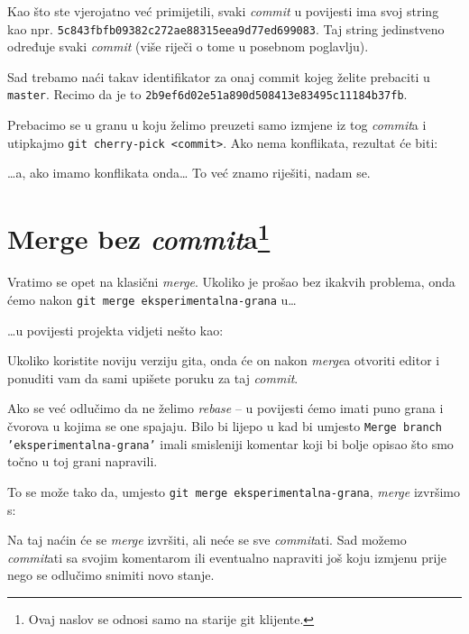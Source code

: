 Kao što ste vjerojatno već primijetili, svaki \emph{commit} u povijesti ima svoj string kao npr. \verb+5c843fbfb09382c272ae88315eea9d77ed699083+.
Taj string jedinstveno određuje svaki \emph{commit} (više riječi o tome u posebnom poglavlju).

Sad trebamo naći takav identifikator za onaj commit kojeg želite prebaciti u \verb+master+. Recimo da je to \verb+2b9ef6d02e51a890d508413e83495c11184b37fb+.

Prebacimo se u granu u koju želimo preuzeti samo izmjene iz tog \emph{commit}a i utipkajmo \verb+git cherry-pick <commit>+.
Ako nema konflikata, rezultat će biti:



\dots{}a, ako imamo konflikata onda\dots 
To već znamo riješiti, nadam se.

\section*{Merge bez \emph{commit}a\footnote{Ovaj naslov se odnosi samo na starije git klijente.}}

Vratimo se opet na klasični \emph{merge}.
Ukoliko je prošao bez ikakvih problema, onda ćemo nakon \verb+git merge eksperimentalna-grana+ u\dots



\dots{}u povijesti projekta vidjeti nešto kao:



Ukoliko koristite noviju verziju gita, onda će on nakon \emph{merge}a otvoriti editor i ponuditi vam da sami upišete poruku za taj \emph{commit}.

Ako se već odlučimo da ne želimo \emph{rebase} -- u povijesti ćemo imati puno grana i čvorova u kojima se one spajaju.
Bilo bi lijepo u kad bi umjesto \texttt{Merge branch 'eksperimentalna-grana'} imali smisleniji komentar koji bi bolje opisao što smo točno u toj grani napravili.

To se može tako da, umjesto \verb+git merge eksperimentalna-grana+, \emph{merge} izvršimo s:


Na taj naćin će se \emph{merge} izvršiti, ali neće se sve \emph{commit}ati. 
Sad možemo \emph{commit}ati sa svojim komentarom ili eventualno napraviti još koju izmjenu prije nego se odlučimo snimiti novo stanje.

